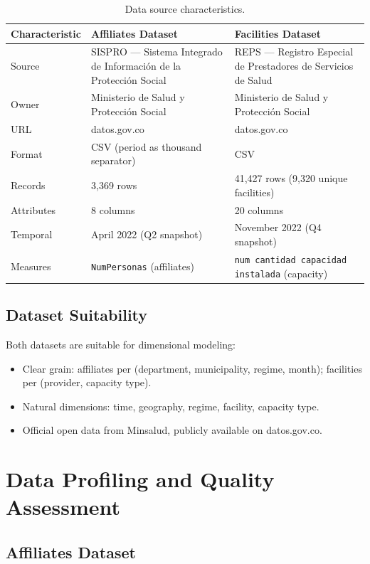 \documentclass[12pt,a4paper]{article}
\begin{document}
\begin{table}[H]
\centering
\small
\begin{tabularx}{\textwidth}{p{3cm} X X}
\toprule
\textbf{Characteristic} & \textbf{Affiliates Dataset} & \textbf{Facilities Dataset}\\
\midrule
Source & SISPRO --- Sistema Integrado de Informaci\'{o}n de la Protecci\'{o}n Social & REPS --- Registro Especial de Prestadores de Servicios de Salud\\
Owner & Ministerio de Salud y Protecci\'{o}n Social & Ministerio de Salud y Protecci\'{o}n Social\\
URL & datos.gov.co & datos.gov.co\\
Format & CSV (period as thousand separator) & CSV\\
Records & 3,369 rows & 41,427 rows (9,320 unique facilities)\\
Attributes & 8 columns & 20 columns\\
Temporal & April 2022 (Q2 snapshot) & November 2022 (Q4 snapshot)\\
Measures & \texttt{NumPersonas} (affiliates) & \texttt{num cantidad capacidad instalada} (capacity)\\
\bottomrule
\end{tabularx}
\caption{Data source characteristics.}
\end{table}

\subsection{Dataset Suitability}

Both datasets are suitable for dimensional modeling:
\begin{itemize}[nosep]
    \item Clear grain: affiliates per (department, municipality, regime, month); facilities per (provider, capacity type).
    \item Natural dimensions: time, geography, regime, facility, capacity type.
    \item Official open data from Minsalud, publicly available on datos.gov.co.
\end{itemize}

\section{Data Profiling and Quality Assessment}

\subsection{Affiliates Dataset}
\end{document}
